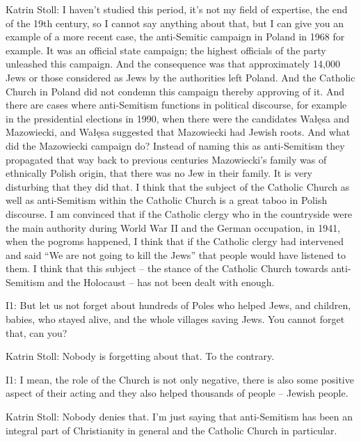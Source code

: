 Katrin Stoll: I haven’t studied this period, it’s not my field of expertise, the end of the 19th century, so I cannot say anything about that, but I can give you an example of a more recent case, the anti-Semitic campaign in Poland in 1968 for example. It was an official state campaign; the highest officials of the party unleashed this campaign. And the consequence was that approximately 14,000 Jews or those considered as Jews by the authorities left Poland. And the Catholic Church in Poland did not condemn this campaign thereby approving of it. And there are cases where anti-Semitism functions in political discourse, for example in the presidential elections in 1990, when there were the candidates Wałęsa and Mazowiecki, and Wałęsa suggested that Mazowiecki had Jewish roots. And what did the Mazowiecki campaign do? Instead of naming this as anti-Semitism they propagated that way back to previous centuries Mazowiecki’s family was of ethnically Polish origin, that there was no Jew in their family. It is very disturbing that they did that. I think that the subject of the Catholic Church as well as anti-Semitism within the Catholic Church is a great taboo in Polish discourse. I am convinced that if the Catholic clergy who in the countryside were the main authority during World War II and the German occupation, in 1941, when the pogroms happened, I think that if the Catholic clergy had intervened and said “We are not going to kill the Jews” that people would have listened to them. I think that this subject – the stance of the Catholic Church towards anti-Semitism and the Holocaust – has not been dealt with enough. 

 

I1: But let us not forget about hundreds of Poles who helped Jews, and children, babies, who stayed alive, and the whole villages saving Jews. You cannot forget that, can you? 

 

Katrin Stoll: Nobody is forgetting about that. To the contrary.  

 

I1: I mean, the role of the Church is not only negative, there is also some positive aspect of their acting and they also helped thousands of people – Jewish people. 

 

Katrin Stoll: Nobody denies that. I’m just saying that anti-Semitism has been an integral part of Christianity in general and the Catholic Church in particular.  

 

